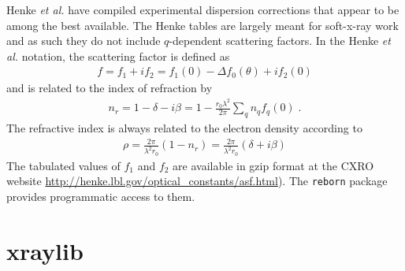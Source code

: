 \documentclass[11pt]{article}
\begin{document}
Henke {\itshape et al.}\cite{henkeXRayInteractionsPhotoabsorption1993} have compiled experimental dispersion corrections that appear to be among the best available.  The Henke tables are largely meant for soft-x-ray work and as such they do not include $q$-dependent scattering factors.
In the Henke {\itshape et al.}\cite{henkeXRayInteractionsPhotoabsorption1993} notation, the scattering factor is defined as
\begin{align}
f=f_1+if_2=f_1(0)-\Delta f_0(\theta)+if_2(0)
\end{align}
and is related to the index of refraction by
\begin{align}
n_r = 1 - \delta -i\beta = 1 -\frac{r_0\lambda^2}{2\pi}\sum_q n_qf_q(0) \; .
\end{align}
The refractive index is always related to the electron density according to
\begin{align}
\rho =  \frac{2\pi}{\lambda^2 r_0 } \left( 1 - n_r \right) = \frac{2\pi}{\lambda^2 r_0 } \left( \delta + i \beta \right) 
\end{align}
The tabulated values of $f_1$ and $f_2$ are available in gzip format at the CXRO website \url{http://henke.lbl.gov/optical_constants/asf.html}).  The \texttt{reborn} package provides programmatic access to them.


\section{xraylib}
\end{document}
